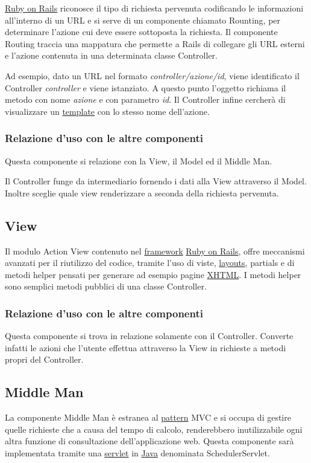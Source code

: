 \documentclass[11pt,a4paper]{article}
\begin{document}
\underline{Ruby on Rails} riconosce il tipo di richiesta pervenuta codificando le informazioni all'interno di un URL e si serve di un componente chiamato Rounting, per determinare l'azione cui deve essere sottoposta la richiesta.
Il componente Routing traccia una mappatura che permette a Rails di collegare gli URL esterni e l'azione contenuta in una determinata classe Controller.

Ad esempio, dato un URL nel formato \textit{controller/azione/id}, viene identificato il Controller \textit{controller} e viene istanziato. A questo punto l'oggetto richiama il metodo con nome \textit{azione} e con parametro \textit{id}. Il Controller infine cercherà di visualizzare un \underline{template} con lo stesso nome dell'azione. 
\subsubsection{Relazione d'uso con le altre componenti}
Questa componente si relazione con la View, il Model ed il Middle Man. 

Il Controller funge da intermediario fornendo i dati alla View attraverso il Model. Inoltre sceglie quale view renderizzare a seconda della richiesta pervenuta.

\subsection{View}\label{view}
 Il modulo Action View contenuto nel \underline{framework} \underline{Ruby on Rails}, offre meccanismi avanzati per il riutilizzo del codice, tramite l'uso di viste, \underline{layouts}, partials e di metodi helper pensati per generare ad esempio pagine \underline{XHTML}.
I metodi helper sono semplici metodi pubblici di una classe Controller.
\subsubsection{Relazione d'uso con le altre componenti}
Questa componente si trova in relazione solamente con il Controller. Converte infatti le azioni che l'utente effettua attraverso la View in richieste a metodi propri del Controller.
\subsection{Middle Man}
La componente Middle Man è estranea al \underline{pattern} MVC e si occupa di gestire quelle richieste che a causa del tempo di calcolo, renderebbero inutilizzabile ogni altra funzione di consultazione dell'applicazione web. 
Questa componente sarà implementata tramite una \underline{servlet} in \underline{Java} denominata SchedulerServlet.
\end{document}
